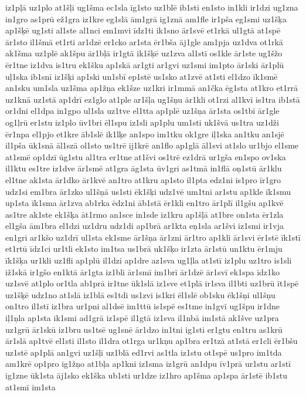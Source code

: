 {iz1pļā
uz1plo
at1šļi
ug1šma
ec1sla
īg1sto
uz1blē
ib1sti
en1sto
in1kli
ir1dzi
ug1zna
in1gro
as1prū
ež1gra
iz1kre
eg1slā
ām1grā
ig1znā
am1fle
ir1pša
eg1smi
uz1šķa
ap1šķē
ug1sti
al1ste
al1nci
em1mvi
īdz1ti
ik1sno
ār1svē
et1rkā
ul1gtā
at1spē
ār1sto
il1šmā
et1rti
ar1dzē
er1cko
ar1sta
ēr1bša
āj1gle
am1pja
uz1dva
ot1rkā
ak1šma
uz1plē
ak1špu
ār1bļā
ir1gtā
ik1šķē
uz1zva
al1stī
os1kle
ār1ste
ug1šžo
ēr1tne
iz1dva
is1tru
ek1šku
ap1skā
ar1gti
ar1gvi
uz1smi
im1pto
ār1ski
ār1plū
uļ1ska
ib1snī
iz1šķi
ap1ski
un1sbī
ep1stē
us1sko
at1zvē
at1sti
el1dzo
īk1smē
an1sku
um1sla
uz1šma
ap1žņa
ek1šze
uz1kri
ir1mmā
an1čka
ēg1sta
at1kro
et1rrā
uz1knā
uz1stā
ap1drī
ez1glo
at1ple
ar1šļa
ug1šņu
ār1kli
ot1rzi
al1kvī
is1tra
ib1stā
or1dni
el1dpa
in1gpo
ul1sla
uz1tve
el1tta
ap1plē
uz1šņa
ār1sta
os1tbi
ār1gle
og1ļrū
er1stu
iz1plo
ūv1bri
ēl1spu
iz1sli
ap1plu
um1sti
uk1švā
us1tra
uz1dži
ēr1npa
el1pjo
et1kre
āb1slē
ik1lķe
an1spo
im1tku
ok1gre
iļ1ska
an1tku
an1sjē
il1pša
ūk1snā
āl1szā
ol1sto
us1trē
ij1krē
an1flo
ap1glā
āl1svi
at1slo
ur1bjo
el1sme
at1smē
op1dzī
ūg1stu
al1tra
er1tne
at1švi
os1trē
ez1drā
ur1gša
en1spo
ov1ska
il1ktu
es1tre
iz1dve
ār1smē
at1gra
āg1sta
ūv1gri
as1tmā
in1flā
oņ1stū
ār1klu
el1tne
ak1sta
ār1dko
ār1kvē
an1tro
at1kru
ap1sto
il1pta
edz1ni
is1pro
īr1gro
udz1si
em1bra
ār1zko
ul1šņā
us1sti
ēk1šķi
udz1vē
um1tni
ar1stu
ap1kle
īk1smu
up1sta
īk1sma
ār1zva
ab1rka
ēdz1ni
āb1stā
ēr1kli
en1tro
ār1plī
il1gšu
ap1kvē
as1tre
ak1ste
ek1šķa
āt1rmo
an1sce
in1sde
iz1kru
ap1šļā
at1bre
on1sta
ēr1zla
el1gša
ām1bra
el1dzi
uz1dru
udz1di
ap1brā
ar1kta
eņ1sla
ar1švi
iz1smi
ir1vja
en1gri
ar1kšo
uz1drī
ul1sta
ek1sme
ār1šņa
ār1zni
ār1tro
ap1kli
ār1svi
ēr1stē
īk1stī
et1rtū
īdz1ci
ur1tli
ek1sto
im1tsa
us1brā
uk1šķo
ir1zta
ār1stū
un1ktu
ēr1mju
īk1šķa
ur1kli
uz1fli
ap1plū
il1dzi
ap1dre
az1sva
ug1ļla
at1stī
iz1plu
uz1tro
is1sli
iž1skā
ir1gšo
en1ktā
ār1gta
iz1bli
ār1smī
im1brī
ār1dzē
ār1svī
ek1spa
īdz1ko
uz1svē
at1plo
or1tla
ab1prā
ir1tne
ūk1slā
iz1sve
et1plā
ir1sva
il1bti
uz1brū
īt1spē
uz1šķē
udz1no
at1slā
iz1blā
es1tdi
us1zvi
is1kri
ēl1slē
ob1sku
ēk1šņi
ul1šņu
on1tro
il1stī
iz1bra
ur1pni
al1dsē
im1ttū
is1spē
es1tme
in1gvī
ug1špu
ir1dne
iļ1ņla
ap1sta
ik1smi
ad1grā
iz1spē
il1gtā
iz1sva
il1nbā
im1stā
ak1šve
uz1pra
uz1grū
ār1skū
iz1bru
us1tsē
ug1snē
ār1dzo
in1tni
ig1sti
er1gtu
en1tru
as1krū
ār1slā
ap1tvē
el1sti
il1sto
il1dra
ot1rga
ur1kņu
ap1bra
er1tzā
at1stā
er1cli
ēr1bšu
uz1stē
ap1plā
an1gvi
uz1šļi
uz1blā
ed1rvi
as1tla
iz1stu
ot1spē
us1pro
im1tda
am1krē
op1pro
ig1žņo
at1bļa
ap1kni
iz1sma
iz1grū
an1dpu
īv1prā
ur1stu
ar1stī
ig1zne
ūk1sta
āj1sko
ek1ška
ub1sti
ur1dze
iz1hro
ap1šma
ap1spa
ār1stē
ib1stu
at1smī
im1sta
}
